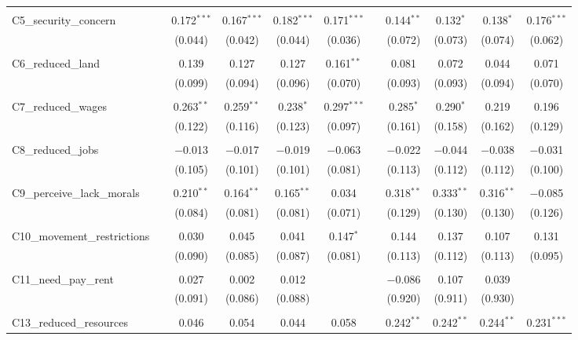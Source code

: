\begin{table}[H]
\begin{tabular}{@{\extracolsep{4pt}}lcccccccccc}
  & & & & & & & & & & \\ 
 C5\_security\_concern &  & 0.172$^{***}$ & 0.167$^{***}$ & 0.182$^{***}$ & 0.171$^{***}$ &  & 0.144$^{**}$ & 0.132$^{*}$ & 0.138$^{*}$ & 0.176$^{***}$ \\ 
  &  & (0.044) & (0.042) & (0.044) & (0.036) &  & (0.072) & (0.073) & (0.074) & (0.062) \\ 
  & & & & & & & & & & \\ 
 C6\_reduced\_land &  & 0.139 & 0.127 & 0.127 & 0.161$^{**}$ &  & 0.081 & 0.072 & 0.044 & 0.071 \\ 
  &  & (0.099) & (0.094) & (0.096) & (0.070) &  & (0.093) & (0.093) & (0.094) & (0.070) \\ 
  & & & & & & & & & & \\ 
 C7\_reduced\_wages &  & 0.263$^{**}$ & 0.259$^{**}$ & 0.238$^{*}$ & 0.297$^{***}$ &  & 0.285$^{*}$ & 0.290$^{*}$ & 0.219 & 0.196 \\ 
  &  & (0.122) & (0.116) & (0.123) & (0.097) &  & (0.161) & (0.158) & (0.162) & (0.129) \\ 
  & & & & & & & & & & \\ 
 C8\_reduced\_jobs &  & $-$0.013 & $-$0.017 & $-$0.019 & $-$0.063 &  & $-$0.022 & $-$0.044 & $-$0.038 & $-$0.031 \\ 
  &  & (0.105) & (0.101) & (0.101) & (0.081) &  & (0.113) & (0.112) & (0.112) & (0.100) \\ 
  & & & & & & & & & & \\ 
 C9\_perceive\_lack\_morals &  & 0.210$^{**}$ & 0.164$^{**}$ & 0.165$^{**}$ & 0.034 &  & 0.318$^{**}$ & 0.333$^{**}$ & 0.316$^{**}$ & $-$0.085 \\ 
  &  & (0.084) & (0.081) & (0.081) & (0.071) &  & (0.129) & (0.130) & (0.130) & (0.126) \\ 
  & & & & & & & & & & \\ 
 C10\_movement\_restrictions &  & 0.030 & 0.045 & 0.041 & 0.147$^{*}$ &  & 0.144 & 0.137 & 0.107 & 0.131 \\ 
  &  & (0.090) & (0.085) & (0.087) & (0.081) &  & (0.113) & (0.112) & (0.113) & (0.095) \\ 
  & & & & & & & & & & \\ 
 C11\_need\_pay\_rent &  & 0.027 & 0.002 & 0.012 &  &  & $-$0.086 & 0.107 & 0.039 &  \\ 
  &  & (0.091) & (0.086) & (0.088) &  &  & (0.920) & (0.911) & (0.930) &  \\ 
  & & & & & & & & & & \\ 
 C13\_reduced\_resources &  & 0.046 & 0.054 & 0.044 & 0.058 &  & 0.242$^{**}$ & 0.242$^{**}$ & 0.244$^{**}$ & 0.231$^{***}$ \\ 

\end{tabular}
\end{table}
